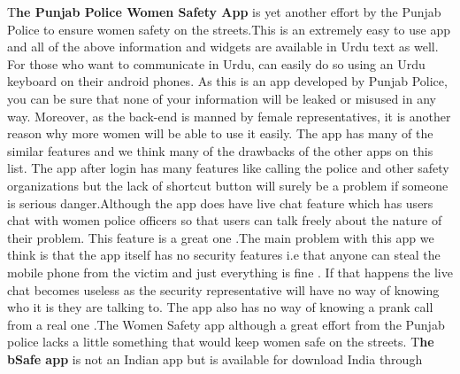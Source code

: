 \documentclass[	DIV=calc,%
							paper=a4,%
							fontsize=12pt,%
							twocolumn]{scrartcl}
\newcommand{\initial}[1]{%
     \lettrine[lines=3,lhang=0.3,nindent=0em]{
     				\color{DarkGoldenrod}
     				{\textsf{#1}}}{}}
\begin{document}
\newline\initial{T}\textbf{he Punjab Police Women Safety App} is yet another effort by the Punjab Police to ensure women safety on the streets.This is an extremely easy to use app and all of the above information and widgets are available in Urdu text as well. For those who want to communicate in Urdu, can easily do so using an Urdu keyboard on their android phones. As this is an app developed by Punjab Police, you can be sure that none of your information will be leaked or misused in any way. Moreover, as the back-end is manned by female representatives, it is another reason why more women will be able to use it easily. The app has many of the similar features and we think many of the drawbacks of the other apps on this list. The app after login has many features like calling the police and other safety organizations but the lack of shortcut button will surely be a problem if someone is serious danger.Although the app does have live chat feature which has users chat with women police officers so that users can talk freely about the nature of their problem. This feature is a great one .The main problem with this app we think is that the app itself has no security features i.e that anyone can steal the mobile phone from the victim and just everything is fine . If that happens the live chat becomes useless as the security representative will have no way of knowing who it is they are talking to. The app also has no way of knowing a prank call from a real one .The Women Safety app although a great effort from the Punjab police lacks a little something that would keep women safe on the streets.
\vspace{8mm}
\newline\initial{T}\textbf{he bSafe app} is not an Indian app  but is available for download India through 
\end{document}
